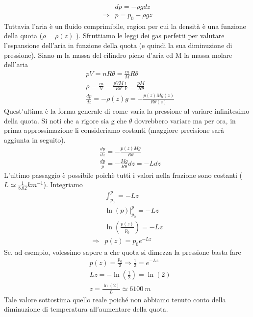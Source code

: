 \documentclass[
10pt, %
a4paper, %
oneside, %
headinclude,footinclude, %
BCOR5mm, %
]{scrartcl}
\begin{document}
\begin{exercise}
\begin{align*}
		&dp = -\rho  g dz \\
		\Rightarrow & p = p_0 - \rho g z
	\end{align*} 
	Tuttavia l'aria è un fluido comprimibile, ragion per cui la densità è una funzione della quota ($\rho = \rho(z)$ ). Sfruttiamo le leggi dei gas perfetti per valutare l'espansione dell'aria in funzione della quota (e quindi la sua diminuzione di pressione). Siano m la massa del cilindro pieno d'aria ed M la massa molare dell'aria
	\begin{align*} 
		&p V = n R \theta = \frac{m}{M} R \theta \\
		&\rho = \frac{m}{V} = \frac{p V M}{R \theta} \frac{1}{V} = \frac{p M}{R \theta}\\
		&\frac{dp}{dz}=-\rho(z) g = - \frac{p(z) M g(z)}{R\theta(z)}
	\end{align*} 
	Quest'ultima è la forma generale di come varia la pressione al variare infinitesimo della quota. Si noti che a rigore sia g che $\theta$ dovrebbero variare ma per ora, in prima approssimazione li consideriamo costanti (maggiore precisione sarà aggiunta in seguito). 
	\begin{align}\label{eq:esercizio_pressione}
		&\frac{dp}{dz}=- \frac{p(z) M g}{R\theta}\nonumber\\
		&\frac{dp}{p} = -\frac{M g}{R \theta} dz = - L dz
	\end{align} 
	L'ultimo passaggio è possibile poichè tutti i valori nella frazione sono costanti ($ L \simeq \frac{1}{8.82} km^{-1}$). Integriamo
	\begin{align*} 
		&\int_{p_0}^{p} = -L z\\
		& \ln(p) \Big|_{p_0}^p = -L z\\
		&\ln\left(\frac{p(z)}{p_0}\right)= - L z\\
		\Rightarrow& p(z) = p_0 e^{-L z}
	\end{align*} 
	Se, ad esempio, volessimo sapere a che quota si dimezza la pressione basta fare
	\begin{align*} 
		&p(z) = \frac{p_0}{2} \Rightarrow \frac{1}{2} = e^{-L z}\\
		&L z = -\ln(\frac{1}{2}) = \ln(2) \\
		&z = \frac{\ln(2)}{L} \simeq 6100\ m
	\end{align*} 
	Tale valore sottostima quello reale poiché non abbiamo tenuto conto della diminuzione di temperatura all'aumentare della quota.
\end{exercise}
\end{document}
